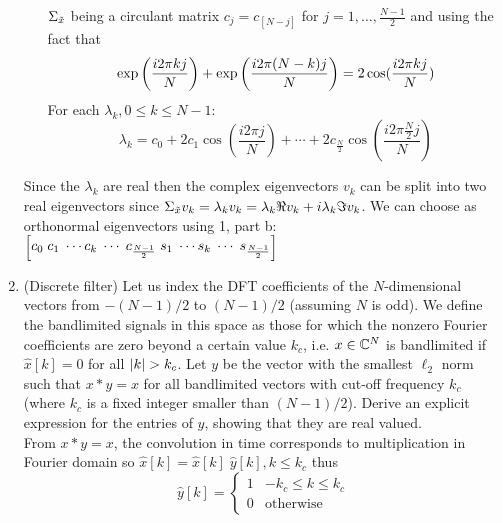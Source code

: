 \documentclass[12pt,twoside]{article}
\begin{document}
\begin{enumerate}
\begin{enumerate}
 $\Sigma_{\tilde{  x }}$ being a circulant matrix $c_j = c_{[N-j]}$ for $j=1,\ldots,\frac{N-1}{2}$ and using the fact that 
  $$
  \exp\left( \frac{i2 \pi k j}{N} \right) +  \exp\left( \frac{i2 \pi (N-k) j}{N} \right) = 2 \cos (\frac{i2 \pi k j}{N})
  $$
  For each $\lambda_k, 0 \le k \le N-1$:
  $$
  	\lambda_k = c_0 +  2 c_1 \cos (\frac{i2 \pi j}{N})+ \cdots +   2 c_{\frac{N}{2}} \cos (\frac{i2 \pi \frac{N}{2} j}{N})
  $$
  \end{enumerate}
Since the $\lambda_k$ are real then the complex eigenvectors $v_k$ can be split into two real eigenvectors since $\Sigma_{\tilde{  x }} v_k = \lambda_k v_k = \lambda_k \Re{v_k} + i \lambda_k \Im{v_k}$.
We can choose as orthonormal eigenvectors using 1, part b: $ \begin{bmatrix} c_0 \; c_{1} \; \cdots c_{k} \; \cdots \;  c_{\frac{N-1}{2}} \; s_{1} \; \cdots s_{k} \; \cdots \;  s_{\frac{N-1}{2}}  \end{bmatrix} $

  \newpage
 \item (Discrete filter) Let us index the DFT coefficients of the $N$-dimensional vectors from $-(N-1)/2$ to $(N-1)/2$ (assuming $N$ is odd). We define the bandlimited signals in this space as those for which the nonzero Fourier coefficients are zero beyond a certain value $k_c$, i.e. $x \in \mathbb{C}^{N}$ is bandlimited if $\hat{x}[k]=0$ for all $\lvert k\rvert>k_c$. Let $y$ be the vector with the smallest $\ell_2$ norm such that $x \ast y = x$ for all bandlimited vectors with cut-off frequency $k_c$ (where $k_c$ is a fixed integer smaller than $(N-1)/2$). Derive an explicit expression for the entries of $y$, showing that they are real valued.\\
 
From  $x \ast y = x$, the convolution in time corresponds to multiplication in  Fourier domain so $\hat{x}[k] = \hat{x}[k] \; \hat{y}[k], k \le k_c$ thus
\begin{equation*}
  \hat{y}[k] =
    \begin{cases}
      1 & -k_c \le k \le k_c\\
      0 & \text{otherwise}
    \end{cases}       
\end{equation*}


\end{enumerate}
\end{document}
